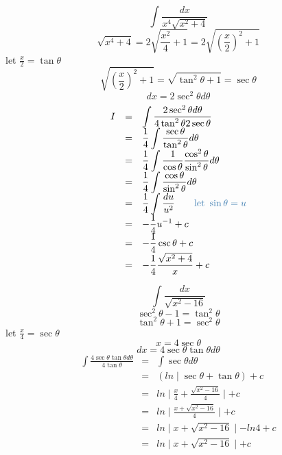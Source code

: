 \begin{eg}
$$\displaystyle \int \frac{dx}{x^4 \sqrt{x^2 +4}}$$
$$\displaystyle \sqrt{x^4 +4} = 2 \sqrt{\frac{x^2}{4} + 1} = 2 \sqrt{(\frac{x}{2})^2 +1}$$
let $\displaystyle \frac{x}{2} = \tan \theta$
$$\displaystyle \sqrt{(\frac{x}{2})^2 + 1} = \sqrt{\tan^2 \theta + 1} = \sec \theta$$
$$dx = 2 \sec^2 \theta d \theta$$
$$\begin{array}{rcl}
I & = & \displaystyle \int \frac{2\sec^2 \theta d\theta}{4\tan^2 \theta 2 \sec \theta}\\
& = & \displaystyle \frac{1}{4} \int \frac{\sec \theta}{\tan^2 \theta} d\theta\\
& = & \displaystyle \frac{1}{4} \int \frac{1}{\cos \theta} \frac{\cos^2 \theta}{\sin^2 \theta}d\theta\\
& = & \displaystyle \frac{1}{4} \int \frac{\cos \theta}{\sin^2 \theta} d\theta\\
& = & \displaystyle \frac{1}{4} \int \frac{du}{u^2} \quad \quad \tssteelblue{\text{let } \sin \theta = u}\\
& = & \displaystyle - \frac{1}{4} u^{-1} + c\\
& = & \displaystyle - \frac{1}{4} \csc \theta + c\\
& = & \displaystyle - \frac{1}{4} \frac{\sqrt{x^2 + 4}}{x} + c
\end{array}$$
\end{eg}
\begin{eg}
$$\displaystyle \int \frac{dx}{\sqrt{x^2-16}}$$
$$\sec^2 \theta -1 = \tan^2 \theta$$
$$\tan^2 \theta + 1 = \sec^2 \theta$$
let $\displaystyle \frac{x}{4} = \sec \theta$
$$x = 4 \sec \theta$$
$$dx = 4 \sec \theta \tan \theta d \theta$$
$$\begin{array}{rcl}
\displaystyle \int \frac{4\sec \theta  \tan \theta d \theta }{4 \tan \theta} & = & \int \sec \theta d \theta\\
& = & (ln \mid \sec \theta + \tan \theta) + c\\
& = & \displaystyle ln \mid \frac{x}{4} + \frac{\sqrt{x^2 -16}}{4} \mid +c\\
& = & \displaystyle ln \mid \frac{x + \sqrt{x^2 - 16}}{4} \mid +c\\
& = & ln \mid x + \sqrt{x^2 -16} \mid - ln 4 +c\\
& = & ln \mid x + \sqrt{x^2 -16} \mid +c
\end{array}$$
\end{eg}
